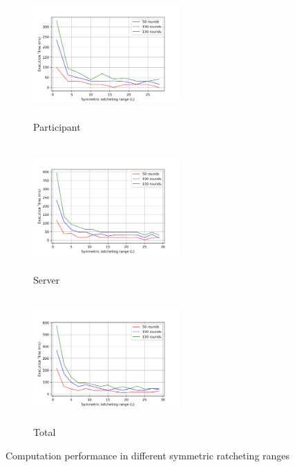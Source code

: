 \documentclass[a4paper,fleqn]{cas-dc}
\begin{document}
\begin{figure}[h!]
    \centering
    \begin{subfigure}[b]{0.3\textwidth}
        \centering
        \includegraphics[width=2.2in,height=1.9in]{Images/computation_participant3.png}
        \caption{Participant}
    \end{subfigure}
    \hspace{0.001\linewidth}
    \begin{subfigure}[b]{0.3\textwidth}
        \centering
        \includegraphics[width=2.2in,height=1.9in]{Images/computation_server1.png}
        \caption{Server}
    \end{subfigure}
    \hspace{0.001\linewidth}
    \begin{subfigure}[b]{0.3\textwidth}
        \centering
        \includegraphics[width=2.2in,height=1.9in]{Images/computation_total.png}
        \caption{Total}
    \end{subfigure}
    \caption{Computation performance in different symmetric ratcheting ranges}
    \label{fig: symetric_ratcheting_range}
\end{figure}
\end{document}
